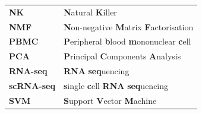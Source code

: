 \documentclass[12pt,]{book}
\theoremstyle{definition}
\theoremstyle{definition}
\theoremstyle{definition}
\theoremstyle{remark}
\begin{document}
\begin{longtable}[]{@{}ll@{}}
\begin{minipage}[t]{0.14\columnwidth}\raggedright
\textbf{NK}\strut
\end{minipage} & \begin{minipage}[t]{0.80\columnwidth}\raggedright
\textbf{N}atural \textbf{K}iller\strut
\end{minipage}\tabularnewline
\begin{minipage}[t]{0.14\columnwidth}\raggedright
\textbf{NMF}\strut
\end{minipage} & \begin{minipage}[t]{0.80\columnwidth}\raggedright
\textbf{N}on-negative \textbf{M}atrix \textbf{F}actorisation\strut
\end{minipage}\tabularnewline
\begin{minipage}[t]{0.14\columnwidth}\raggedright
\textbf{PBMC}\strut
\end{minipage} & \begin{minipage}[t]{0.80\columnwidth}\raggedright
\textbf{P}eripheral \textbf{b}lood \textbf{m}ononuclear
\textbf{c}ell\strut
\end{minipage}\tabularnewline
\begin{minipage}[t]{0.14\columnwidth}\raggedright
\textbf{PCA}\strut
\end{minipage} & \begin{minipage}[t]{0.80\columnwidth}\raggedright
\textbf{P}rincipal \textbf{C}omponents \textbf{A}nalysis\strut
\end{minipage}\tabularnewline
\begin{minipage}[t]{0.14\columnwidth}\raggedright
\textbf{RNA-seq}\strut
\end{minipage} & \begin{minipage}[t]{0.80\columnwidth}\raggedright
\textbf{RNA} \textbf{seq}uencing\strut
\end{minipage}\tabularnewline
\begin{minipage}[t]{0.14\columnwidth}\raggedright
\textbf{scRNA-seq}\strut
\end{minipage} & \begin{minipage}[t]{0.80\columnwidth}\raggedright
\textbf{s}ingle \textbf{c}ell \textbf{RNA} \textbf{seq}uencing\strut
\end{minipage}\tabularnewline
\begin{minipage}[t]{0.14\columnwidth}\raggedright
\textbf{SVM}\strut
\end{minipage} & \begin{minipage}[t]{0.80\columnwidth}\raggedright
\textbf{S}upport \textbf{V}ector \textbf{M}achine\strut

\end{minipage}
\end{longtable}
\end{document}
